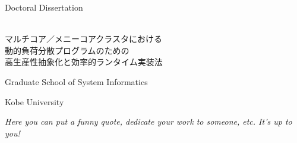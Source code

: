 \documentclass[11pt,twoside,a4paper]{book}
\makeatletter
\def\cleardoublepage{\clearpage\if@twoside \ifodd\c@page\else
	\hbox{}\thispagestyle{empty}\newpage\if@twocolumn\hbox{}\newpage\fi\fi\fi}
\newcommand{\titlejp}{マルチコア／メニーコアクラスタにおける\\動的負荷分散プログラムのための\\高生産性抽象化と効率的ランタイム実装法} %
\newcommand{\gradschool}{Graduate School of System Informatics} %
\newcommand{\university}{Kobe University} %
\makeatother
\begin{document}
\frontmatter %
\pagestyle{empty}  %
\cleardoublepage
{} %
\begin{center}
\makeatletter
\Large{Doctoral Dissertation}

\vspace*{\fill}

\Large{\MakeUppercase{\@title}}\\
\vspace{1.5cm}
\LARGE{\titlejp}

\vspace*{\fill}

\vspace{1cm}
\gradschool

\university

\vspace{1cm}
\@author

\makeatother
\end{center}
\cleardoublepage
\thispagestyle{empty} %
\vspace*{6cm} %
\Large{\textit{Here you can put a funny quote, dedicate your work to someone, etc. It's up to you!}} %

\pagestyle{plain} %
\normalsize %


\end{document}
